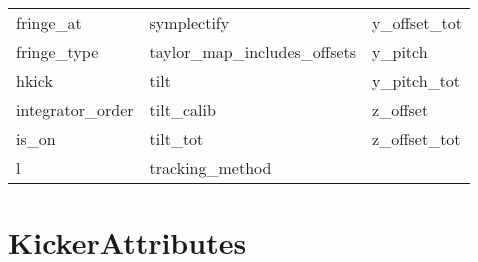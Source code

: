 \begin{tabular}{lll}
fringe_at                   & symplectify                 & y_offset_tot                \\
fringe_type                 & taylor_map_includes_offsets & y_pitch                     \\
hkick                       & tilt                        & y_pitch_tot                 \\
integrator_order            & tilt_calib                  & z_offset                    \\
is_on                       & tilt_tot                    & z_offset_tot                \\
l                           & tracking_method             &                             \\
 \bottomrule
 \end{tabular}
 \vfill
 
 \section{KickerAttributes}
 \label{s:list.kicker}
 
